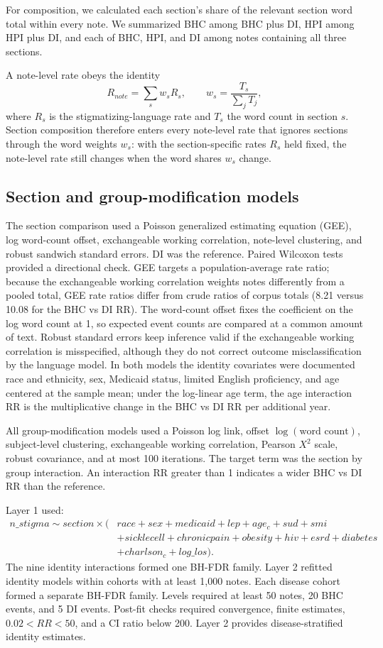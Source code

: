 \documentclass[unnumsec,webpdf,contemporary,large]{oup-authoring-template}
\begin{document}
For composition, we calculated each section's share of the relevant section word total within every note. We summarized BHC among BHC plus DI, HPI among HPI plus DI, and each of BHC, HPI, and DI among notes containing all three sections.

A note-level rate obeys the identity
\[
R_{note}=\sum_s w_sR_s, \qquad w_s=\frac{T_s}{\sum_j T_j},
\]
where $R_s$ is the stigmatizing-language rate and $T_s$ the word count in section $s$. Section composition therefore enters every note-level rate that ignores sections through the word weights $w_s$: with the section-specific rates $R_s$ held fixed, the note-level rate still changes when the word shares $w_s$ change.

\subsection{Section and group-modification models}

The section comparison used a Poisson generalized estimating equation (GEE), log word-count offset, exchangeable working correlation, note-level clustering, and robust sandwich standard errors. DI was the reference. Paired Wilcoxon tests provided a directional check. GEE targets a population-average rate ratio; because the exchangeable working correlation weights notes differently from a pooled total, GEE rate ratios differ from crude ratios of corpus totals (8.21 versus 10.08 for the BHC vs DI RR). The word-count offset fixes the coefficient on the log word count at 1, so expected event counts are compared at a common amount of text. Robust standard errors keep inference valid if the exchangeable working correlation is misspecified, although they do not correct outcome misclassification by the language model. In both models the identity covariates were documented race and ethnicity, sex, Medicaid status, limited English proficiency, and age centered at the sample mean; under the log-linear age term, the age interaction RR is the multiplicative change in the BHC vs DI RR per additional year.

All group-modification models used a Poisson log link, offset \(\log(\text{word count})\), subject-level clustering, exchangeable working correlation, Pearson \(X^2\) scale, robust covariance, and at most 100 iterations. The target term was the section by group interaction. An interaction RR greater than 1 indicates a wider BHC vs DI RR than the reference.

Layer 1 used:
\[
\begin{split}
n\_stigma \sim section \times (&race + sex + medicaid + lep + age_c + sud + smi\\
&+ sicklecell + chronicpain + obesity + hiv + esrd + diabetes\\
&+ charlson_c + log\_los).
\end{split}
\]
The nine identity interactions formed one BH-FDR family. Layer 2 refitted identity models within cohorts with at least 1,000 notes. Each disease cohort formed a separate BH-FDR family. Levels required at least 50 notes, 20 BHC events, and 5 DI events. Post-fit checks required convergence, finite estimates, \(0.02<RR<50\), and a CI ratio below 200. Layer 2 provides disease-stratified identity estimates.
\end{document}
